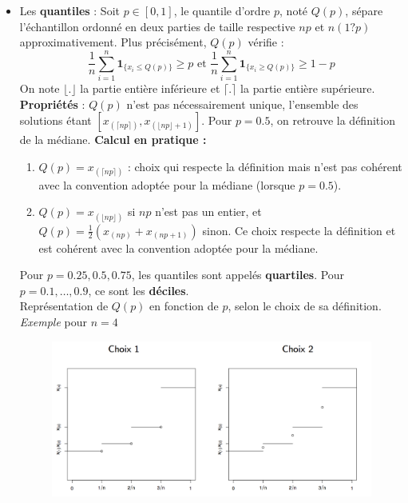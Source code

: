 \begin{itemize}
\item Les \textbf{quantiles} : Soit $p \in [0, 1]$, le quantile d'ordre $p$, noté $Q(p)$, sépare l'échantillon ordonné en deux parties de taille respective $np$ et $n(1 ? p)$ approximativement.
Plus précisément, $Q(p)$ vérifie : 
$$\frac{1}{n} \sum_{i=1}^{n} \mathbf{1}_{\{x_{i}\leq Q(p)\}} \geq p \textrm{ et }\frac{1}{n} \sum_{i=1}^{n} \mathbf{1}_{\{x_{i}\geq Q(p)\}} \geq 1-p$$
On note $\lfloor . \rfloor$ la partie entière inférieure et $\lceil . \rceil$ la partie entière supérieure.\newline
\textbf{Propriétés} : $Q(p)$ n'est pas nécessairement unique, l'ensemble des solutions étant $[x_{(\lceil np\rceil)}, x_{(\lfloor np \rfloor+1)}]$. Pour $p = 0.5$, on retrouve la définition de la médiane.\newline
\textbf{Calcul en pratique :}
\begin{enumerate}
\item $Q(p) = x_{(\lceil np\rceil)}$ : choix qui respecte la définition mais n'est pas cohérent avec la convention adoptée pour la médiane (lorsque $p = 0.5$).
\item $Q(p) = x_{(\lfloor np\rfloor)}$ si $np$ n'est pas un entier, et $Q(p) = \frac{1}{2}(x_{(np)} + x_{(np+1)})$ sinon. Ce choix respecte la définition et est cohérent avec la convention adoptée pour la médiane.
\end{enumerate}
Pour $p = 0.25, 0.5, 0.75$, les quantiles sont appelés \textbf{quartiles}.\newline
Pour $p = 0.1, \dots , 0.9$, ce sont les \textbf{déciles}.\newline
\\
Représentation de $Q(p)$ en fonction de $p$, selon le choix de sa définition. \textit{Exemple} pour $n = 4$
\begin{figure}[H]\begin{center}\includegraphics[scale=0.7]{ilu/ccm5.png}\end{center}\end{figure}

\end{itemize}
